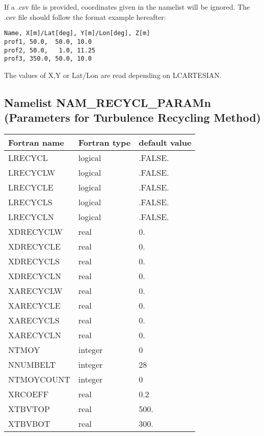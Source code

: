 If a .csv file is provided, coordinates given in the namelist will be ignored. The .csv file should follow the format example hereafter:
\begin{verbatim}
Name, X[m]/Lat[deg], Y[m]/Lon[deg], Z[m]
prof1, 50.0,  50.0, 10.0
prof2, 50.0,   1.0, 11.25
prof3, 350.0, 50.0, 10.0
\end{verbatim}
The values of X,Y or Lat/Lon are read depending on LCARTESIAN.

\subsection{Namelist NAM\_RECYCL\_PARAMn (Parameters for Turbulence Recycling Method)}
\begin{longtable} {|p{}|p{}|p{}|}
\hline
Fortran name &  Fortran type & default value \\
\hline 
\endhead
\hline
\endfoot
LRECYCL              & logical       & .FALSE.       \\
LRECYCLW             & logical       & .FALSE.       \\
LRECYCLE             & logical       & .FALSE.       \\
LRECYCLS             & logical       & .FALSE.       \\
LRECYCLN             & logical       & .FALSE.       \\
XDRECYCLW            & real          & 0.            \\
XDRECYCLE            & real          & 0.            \\
XDRECYCLS            & real          & 0.            \\
XDRECYCLN            & real          & 0.            \\
XARECYCLW            & real          & 0.            \\
XARECYCLE            & real          & 0.            \\
XARECYCLS            & real          & 0.            \\
XARECYCLN            & real          & 0.            \\
NTMOY                & integer       & 0             \\
NNUMBELT             & integer       & 28            \\
NTMOYCOUNT           & integer       & 0             \\
XRCOEFF              & real          & 0.2           \\
XTBVTOP              & real          & 500.          \\
XTBVBOT              & real          & 300.          \\
\end{longtable}

